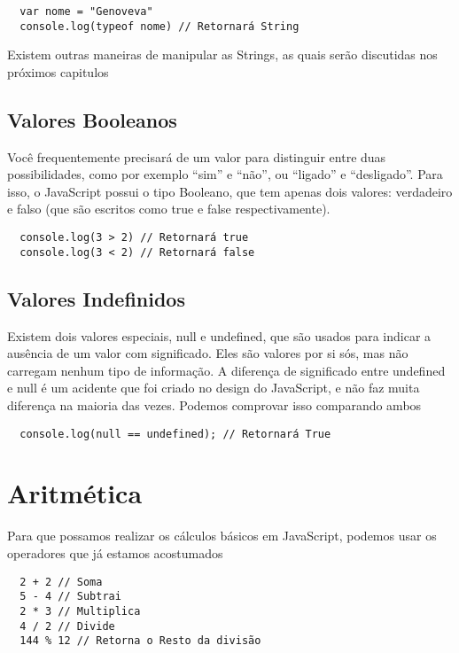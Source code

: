 \begin{lstlisting}
  var nome = "Genoveva"
  console.log(typeof nome) // Retornará String
\end{lstlisting}

Existem outras maneiras de manipular as Strings, as quais serão discutidas nos próximos capitulos

\subsection{Valores Booleanos}

Você frequentemente precisará de um valor para distinguir entre duas possibilidades, como por exemplo “sim” e “não”, ou “ligado” e “desligado”. Para isso, o JavaScript possui o tipo Booleano, que tem apenas dois valores: verdadeiro e falso (que são escritos como true e false respectivamente).

\begin{lstlisting}
  console.log(3 > 2) // Retornará true
  console.log(3 < 2) // Retornará false
\end{lstlisting}

\subsection{Valores Indefinidos}

Existem dois valores especiais, null e undefined, que são usados para indicar a ausência de um valor com significado. Eles são valores por si sós, mas não carregam nenhum tipo de informação. A diferença de significado entre undefined e null é um acidente que foi criado no design do JavaScript, e não faz muita diferença na maioria das vezes. Podemos comprovar isso comparando ambos

\begin{lstlisting}
  console.log(null == undefined); // Retornará True
\end{lstlisting}

\section{Aritmética}

Para que possamos realizar os cálculos básicos em JavaScript, podemos usar os operadores que já estamos acostumados

\begin{lstlisting}
  2 + 2 // Soma
  5 - 4 // Subtrai
  2 * 3 // Multiplica
  4 / 2 // Divide
  144 % 12 // Retorna o Resto da divisão
\end{lstlisting}

